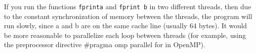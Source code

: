 {	\begin{figure}[H]
		
	\end{figure}
	\par If you run the functions \texttt{fprint\textunderscore a} and \texttt{fprint \textunderscore b} in two different threads, then due to the constant synchronization of memory between the threads, the program will run slowly, since a and b are on the same cache line (usually 64 bytes). It would be more reasonable to parallelize each loop between threads (for example, using the preprocessor directive  \#pragma omp parallel for in OpenMP).
}